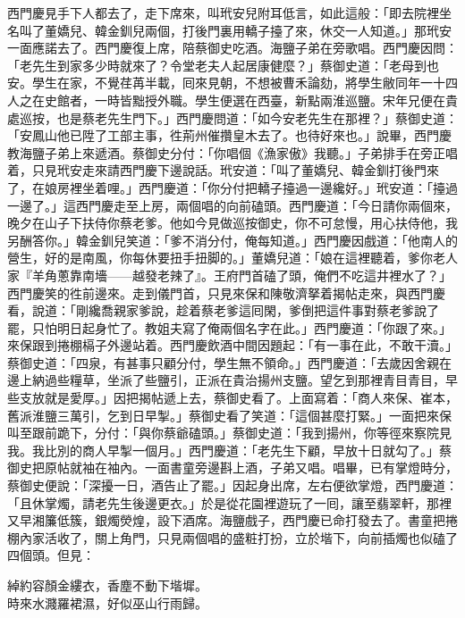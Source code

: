 西門慶見手下人都去了，走下席來，叫玳安兒附耳低言，如此這般：「即去院裡坐名叫了董嬌兒、韓金釧兒兩個，打後門裏用轎子擡了來，休交一人知道。」那玳安一面應諾去了。西門慶復上席，陪蔡御史吃酒。海鹽子弟在旁歌唱。西門慶因問：「老先生到家多少時就來了？令堂老夫人起居康健麼？」蔡御史道：「老母到也安。學生在家，不覺荏苒半載，囘來見朝，不想被曹禾論劾，將學生敝同年一十四人之在史館者，一時皆黜授外職。{}學生便選在西臺，新點兩淮巡鹽。宋年兄便在貴處巡按，也是蔡老先生門下。」西門慶問道：「如今安老先生在那裡？」蔡御史道：「安鳳山他已陞了工部主事，徃荊州催攢皇木去了。也待好來也。」說畢，西門慶教海鹽子弟上來遞酒。蔡御史分付：「你唱個《漁家傲》我聽。」子弟排手在旁正唱着，只見玳安走來請西門慶下邊說話。玳安道：「叫了董嬌兒、韓金釧打後門來了，在娘房裡坐着哩。」西門慶道：「你分付把轎子擡過一邊纔好。」玳安道：「擡過一邊了。」這西門慶走至上房，兩個唱的向前磕頭。西門慶道：「今日請你兩個來，晚夕在山子下扶侍你蔡老爹。他如今見做巡按御史，你不可怠慢，用心扶侍他，我另酬答你。」韓金釧兒笑道：「爹不消分付，俺每知道。」西門慶因戲道：「他南人的營生，好的是南風，你每休要扭手扭脚的。」董嬌兒道：「娘在這裡聽着，爹你老人家『羊角蔥靠南墻——越發老辣了』。王府門首磕了頭，俺們不吃這井裡水了？」西門慶笑的徃前邊來。走到儀門首，只見來保和陳敬濟拏着揭帖走來，與西門慶看，說道：「剛纔喬親家爹說，趁着蔡老爹這囘閑，爹倒把這件事對蔡老爹說了罷，只怕明日起身忙了。教姐夫寫了俺兩個名字在此。」西門慶道：「你跟了來。」來保跟到捲棚槅子外邊站着。西門慶飲酒中間因題起：「有一事在此，不敢干瀆。」蔡御史道：「四泉，有甚事只顧分付，學生無不領命。」西門慶道：「去歲因舍親在邊上納過些糧草，坐派了些鹽引，正派在貴治揚州支鹽。望乞到那裡青目青目，早些支放就是愛厚。」因把揭帖遞上去，蔡御史看了。上面寫着：「商人來保、崔本，舊派淮鹽三萬引，乞到日早掣。」蔡御史看了笑道：「這個甚麼打緊。」一面把來保叫至跟前跪下，分付：「與你蔡爺磕頭。」蔡御史道：「我到揚州，你等徑來察院見我。我比別的商人早掣一個月。」西門慶道：「老先生下顧，早放十日就勾了。」蔡御史把原帖就袖在袖內。一面書童旁邊斟上酒，子弟又唱。唱畢，已有掌燈時分，蔡御史便說：「深擾一日，酒告止了罷。」因起身出席，左右便欲掌燈，西門慶道：「且休掌燭，請老先生後邊更衣。」於是從花園裡遊玩了一囘，讓至翡翠軒，那裡又早湘簾低簇，銀燭熒煌，設下酒席。海鹽戲子，西門慶已命打發去了。書童把捲棚內家活收了，關上角門，只見兩個唱的盛粧打扮，立於堦下，向前插燭也似磕了四個頭。但見：

\begin{myquote} 
綽約容顏金縷衣，香塵不動下堦墀。\\時來水濺羅裙濕，好似巫山行雨歸。
\end{myquote} 

